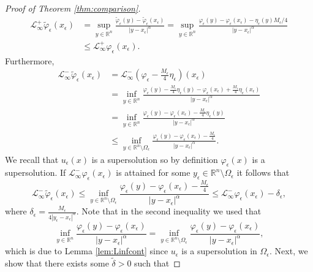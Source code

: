 \documentclass[10pt,a4paper]{amsart}
\providecommand{\Lneg}{\mathcal{L}_{\infty}^-}
\providecommand{\Lpos}{\mathcal{L}_{\infty}^+}
\providecommand{\Rn}{\mathbb{R}^n}
\begin{document}
\begin{proof}[Proof of Theorem \ref{thm:comparison}]
\begin{align}
    \Lpos \tilde{\varphi}_{\epsilon}(x_{\epsilon}) &= \sup_{y \in \Rn} \frac{\tilde{\varphi}_{\epsilon}(y)-\tilde{\varphi}_{\epsilon}(x_{\epsilon})}{|y-x_{\epsilon}|^{\alpha}} = \sup_{y \in \Rn} \frac{\varphi_{\epsilon}(y)-\varphi_{\epsilon}(x_{\epsilon})-\eta_{\epsilon} (y)M_{\epsilon}/4}{|y-x_{\epsilon}|^{\alpha}} \nonumber \\
    & \leq \Lpos \varphi_{\epsilon}(x_{\epsilon}). \label{eq:Lplus}
\end{align}
 Furthermore, 
\begin{align}
    \Lneg \tilde{\varphi}_{\epsilon}(x_{\epsilon}) &= \Lneg \left(\varphi_{\epsilon}-\frac{M_{\epsilon}}{4} \eta_{\epsilon} \right)(x_{\epsilon}) \nonumber \\  
    &= \inf_{y \in \Rn} \frac{\varphi_{\epsilon}(y)-\frac{M_{\epsilon}}{4}\eta_{\epsilon} (y)-\varphi_{\epsilon}(x_{\epsilon})+\frac{M_{\epsilon}}{4}\eta_{\epsilon} (x_{\epsilon})}{|y-x_{\epsilon}|^{\alpha}}\nonumber   \\
    &=\inf_{y \in \Rn} \frac{\varphi_{\epsilon}(y)-\varphi_{\epsilon}(x_{\epsilon})-\frac{M_{\epsilon}}{4}\eta_{\epsilon} (y)}{|y-x_{\epsilon}|^{\alpha}} \nonumber \\
    &\leq  \inf_{y \in \Rn \setminus \Omega_{\epsilon}} \frac{\varphi_{\epsilon}(y)-\varphi_{\epsilon}(x_{\epsilon})-\frac{M_{\epsilon}}{4}}{|y-x_{\epsilon}|^{\alpha}}. \nonumber  %
\end{align}
We recall that $u_{\epsilon}(x)$ is a supersolution so by definition $\varphi_{\epsilon}(x)$ is a supersolution. If $\Lneg \varphi_{\epsilon}(x_{\epsilon})$ is attained for some $y_{\epsilon} \in \Rn \setminus \Omega_{\epsilon}$ it follows that
\begin{equation}\label{eq:wantthis}
   \Lneg \tilde{\varphi}_{\epsilon}(x_{\epsilon}) \leq \inf_{y \in \Rn \setminus \Omega_{\epsilon}} \frac{\varphi_{\epsilon}(y)-\varphi_{\epsilon}(x_{\epsilon})-\frac{M_{\epsilon}}{4}}{|y-x_{\epsilon}|^{\alpha}} \leq  \Lneg \varphi_{\epsilon}(x_{\epsilon})-\delta_{\epsilon},
\end{equation}
where $\delta_{\epsilon} = \frac{M_{\epsilon}}{4|y_{\epsilon}-x_{\epsilon}|^{\alpha}}$. Note that in the second inequality we used that
$$
\inf_{y \in \Rn} \frac{\varphi_{\epsilon}(y)-\varphi_{\epsilon}(x_{\epsilon})}{|y-x_{\epsilon}|^{\alpha}} = \inf_{y \in \Rn \setminus \Omega_{\epsilon}} \frac{\varphi_{\epsilon}(y)-\varphi_{\epsilon}(x_{\epsilon})}{|y-x_{\epsilon}|^{\alpha}},
$$
which is due to Lemma \ref{lem:Linfcont} since $u_{\epsilon}$ is a supersolution in $\Omega_{\epsilon}$. Next, we show that there exists some $\tilde{\delta}>0$ such that

\end{proof}
\end{document}
